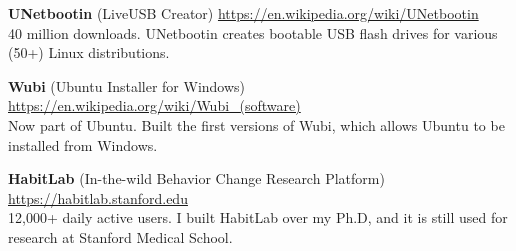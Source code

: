 
\textbf{UNetbootin} (LiveUSB Creator) \hfill \url{https://en.wikipedia.org/wiki/UNetbootin}\\ %
\textcolor{sectcol}{40 million downloads.} UNetbootin creates bootable USB flash drives for various (50+) Linux distributions.\\ %

\vspace{-1mm}

\textbf{Wubi} (Ubuntu Installer for Windows) \hfill \url{https://en.wikipedia.org/wiki/Wubi_(software)}\\ %
\textcolor{sectcol}{Now part of Ubuntu.} Built the first versions of Wubi, which allows Ubuntu to be installed from Windows.\\ %

\vspace{-1mm}

\textbf{HabitLab} (In-the-wild Behavior Change Research Platform) \hfill \url{https://habitlab.stanford.edu}\\ %
\textcolor{sectcol}{12,000+ daily active users.} I built HabitLab over my Ph.D, and it is still used for research at Stanford Medical School.\\ %

